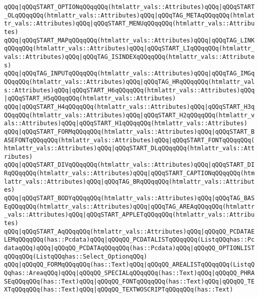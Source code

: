 \verb|qQQq|\verb#|qQQqSTART_OPTIONqQQqqQQq(htmlattr_vals::Attributes)qQQq|qQQqSTART_OLqQQqqQQq(htmlattr_vals::Attributes)qQQq|qQQqTAG_METAqQQqqQQq(htmlattr_vals::Attributes)qQQq|qQQqSTART_MENUqQQqqQQq(htmlattr_vals::Attributes)#\newline
\verb|qQQq|\verb#|qQQqSTART_MAPqQQqqQQq(htmlattr_vals::Attributes)qQQq|qQQqTAG_LINKqQQqqQQq(htmlattr_vals::Attributes)qQQq|qQQqSTART_LIqQQqqQQq(htmlattr_vals::Attributes)qQQq|qQQqTAG_ISINDEXqQQqqQQq(htmlattr_vals::Attributes)#\newline
\verb|qQQq|\verb#|qQQqTAG_INPUTqQQqqQQq(htmlattr_vals::Attributes)qQQq|qQQqTAG_IMGqQQqqQQq(htmlattr_vals::Attributes)qQQq|qQQqTAG_HRqQQqqQQq(htmlattr_vals::Attributes)qQQq|qQQqSTART_H6qQQqqQQq(htmlattr_vals::Attributes)qQQq|qQQqSTART_H5qQQqqQQq(htmlattr_vals::Attributes)#\newline
\verb|qQQq|\verb#|qQQqSTART_H4qQQqqQQq(htmlattr_vals::Attributes)qQQq|qQQqSTART_H3qQQqqQQq(htmlattr_vals::Attributes)qQQq|qQQqSTART_H2qQQqqQQq(htmlattr_vals::Attributes)qQQq|qQQqSTART_H1qQQqqQQq(htmlattr_vals::Attributes)#\newline
\verb|qQQq|\verb#|qQQqSTART_FORMqQQqqQQq(htmlattr_vals::Attributes)qQQq|qQQqSTART_BASEFONTqQQqqQQq(htmlattr_vals::Attributes)qQQq|qQQqSTART_FONTqQQqqQQq(htmlattr_vals::Attributes)qQQq|qQQqSTART_DLqQQqqQQq(htmlattr_vals::Attributes)#\newline
\verb|qQQq|\verb#|qQQqSTART_DIVqQQqqQQq(htmlattr_vals::Attributes)qQQq|qQQqSTART_DIRqQQqqQQq(htmlattr_vals::Attributes)qQQq|qQQqSTART_CAPTIONqQQqqQQq(htmlattr_vals::Attributes)qQQq|qQQqTAG_BRqQQqqQQq(htmlattr_vals::Attributes)#\newline
\verb|qQQq|\verb#|qQQqSTART_BODYqQQqqQQq(htmlattr_vals::Attributes)qQQq|qQQqTAG_BASEqQQqqQQq(htmlattr_vals::Attributes)qQQq|qQQqTAG_AREAqQQqqQQq(htmlattr_vals::Attributes)qQQq|qQQqSTART_APPLETqQQqqQQq(htmlattr_vals::Attributes)#\newline
\verb|qQQq|\verb#|qQQqSTART_AqQQqqQQq(htmlattr_vals::Attributes)qQQq|qQQqQQ_PCDATAELEMqQQqqQQq(has::Pcdata)qQQq|qQQqQQ_PCDATALISTqQQqqQQq(ListqQQqhas::PcdataqQQq)qQQq|qQQqQQ_PCDATAqQQqqQQq(has::Pcdata)qQQq|qQQqQQ_OPTIONLISTqQQqqQQq(ListqQQqhas::Select_OptionqQQq)#\newline
\verb|qQQq|\verb#|qQQqQQ_FORMqQQqqQQq(has::Text)qQQq|qQQqQQ_AREALISTqQQqqQQq(ListqQQqhas::AreaqQQq)qQQq|qQQqQQ_SPECIALqQQqqQQq(has::Text)qQQq|qQQqQQ_PHRASEqQQqqQQq(has::Text)qQQq|qQQqQQ_FONTqQQqqQQq(has::Text)qQQq|qQQqQQ_TEXTqQQqqQQq(has::Text)qQQq|qQQqQQ_TEXTWOSCRIPTqQQqqQQq(has::Text)#\newline
